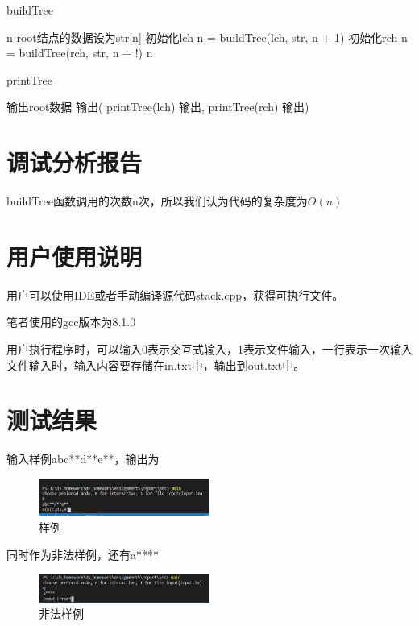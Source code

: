 \begin{algorithm}[htb] 
   \caption{ buildTree } 
   \label{alg:Framwork} 
   \begin{algorithmic}[1]
      
         \State \Return n
      \Else
         \State root结点的数据设为str[n]
         \State 初始化lch
         \State n = buildTree(lch, str, n + 1)
         \State 初始化rch
         \State n = buildTree(rch, str, n + !)
         \State \Return n
      \EndIf
   \EndFunction

   \end{algorithmic} 
\end{algorithm}

\newpage

\begin{algorithm}[htb] 
   \caption{ printTree } 
   \label{alg:Framwork} 
   \begin{algorithmic}[1]
            \State \Return
         \Else
            \State 输出root数据
               \State 输出(
                  \State printTree(lch)
                  \State 输出,
                  \State printTree(rch)
               \State 输出)
            \EndIf
         \EndIf
      \EndFunction
   \end{algorithmic} 
\end{algorithm}


\section{调试分析报告}
   buildTree函数调用的次数n次，所以我们认为代码的复杂度为$O(n)$

\section{用户使用说明}
用户可以使用IDE或者手动编译源代码stack.cpp，获得可执行文件。

笔者使用的gcc版本为8.1.0

用户执行程序时，可以输入0表示交互式输入，1表示文件输入，一行表示一次输入
文件输入时，输入内容要存储在in.txt中，输出到out.txt中。

\section{测试结果}

输入样例abc**d**e**，输出为
\begin{figure}[H]
	\centering
	\includegraphics[width=0.5\textwidth]{images/样例1.png}
	\caption{样例}
\end{figure}
同时作为非法样例，还有a****
\begin{figure}[H]
	\centering
	\includegraphics[width=0.5\textwidth]{images/样例2.png}
	\caption{非法样例}
\end{figure}
